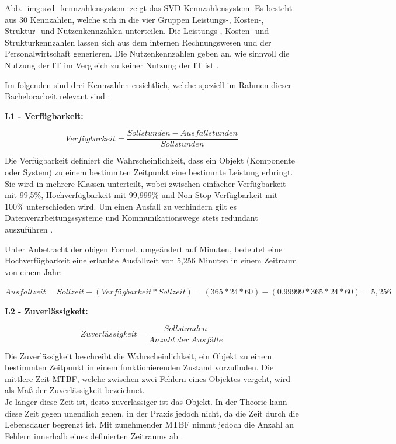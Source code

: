 Abb. \ref{img:svd_kennzahlensystem} zeigt das SVD Kennzahlensystem. Es besteht aus 30 Kennzahlen, welche sich in die vier Gruppen Leistungs-, Kosten-, Struktur- und Nutzenkennzahlen unterteilen. Die Leistungs-, Kosten- und Strukturkennzahlen lassen sich aus dem internen Rechnungswesen und der Personalwirtschaft generieren. Die Nutzenkennzahlen geben an, wie sinnvoll die Nutzung der IT im Vergleich zu keiner Nutzung der IT ist \cite{Gadatsch10}.

Im folgenden sind drei Kennzahlen ersichtlich, welche speziell im Rahmen dieser Bachelorarbeit relevant sind \cite{Gadatsch10}:

\textbf{L1 - Verfügbarkeit:}

$$Verfügbarkeit = \frac{Sollstunden - Ausfallstunden}{Sollstunden}$$

Die Verfügbarkeit definiert die Wahrscheinlichkeit, dass ein Objekt (Komponente oder System) zu einem bestimmten Zeitpunkt eine bestimmte Leistung erbringt. Sie wird in mehrere Klassen unterteilt, wobei zwischen einfacher Verfügbarkeit mit 99,5\%, Hochverfügbarkeit mit 99,999\% und Non-Stop Verfügbarkeit mit 100\% unterschieden wird. Um einen Ausfall zu verhindern gilt es Datenverarbeitungssysteme und Kommunikationswege stets redundant auszuführen \cite{Availability}.

Unter Anbetracht der obigen Formel, umgeändert auf Minuten, bedeutet eine Hochverfügbarkeit eine erlaubte Ausfallzeit von 5,256 Minuten in einem Zeitraum von einem Jahr: 

$Ausfallzeit = Sollzeit - (Verfügbarkeit * Sollzeit) = (365 * 24 * 60) - (0.99999 * 365 * 24 * 60) = 5,256$

\textbf{L2 - Zuverlässigkeit:}

$$Zuverlässigkeit = \frac{Sollstunden}{Anzahl\;der\;Ausfälle}$$

Die Zuverlässigkeit beschreibt die Wahrscheinlichkeit, ein Objekt zu einem bestimmten Zeitpunkt in einem funktionierenden Zustand vorzufinden. Die mittlere Zeit \ac{MTBF}, welche zwischen zwei Fehlern eines Objektes vergeht, wird als Maß der Zuverlässigkeit bezeichnet. \\
Je länger diese Zeit ist, desto zuverlässiger ist das Objekt. In der Theorie kann diese Zeit gegen unendlich gehen, in der Praxis jedoch nicht, da die Zeit durch die Lebensdauer begrenzt ist. Mit zunehmender \ac{MTBF} nimmt jedoch die Anzahl an Fehlern innerhalb eines definierten Zeitraums ab \cite{Eberlin14}. 

